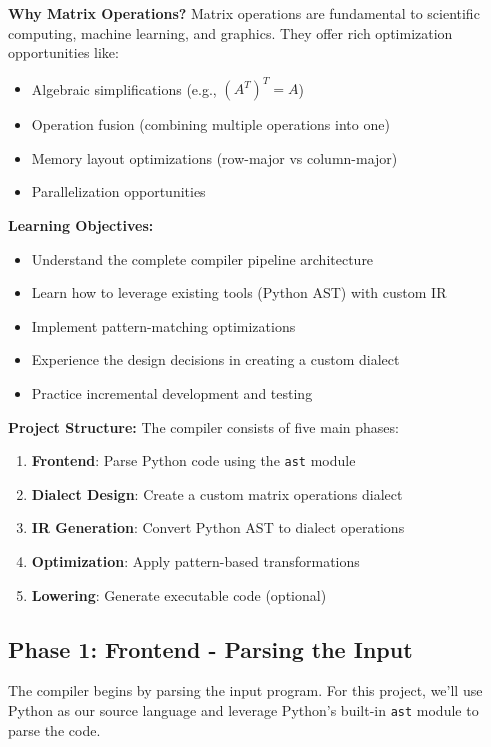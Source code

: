 \documentclass[11pt,a4paper]{article}
\begin{document}
\textbf{Why Matrix Operations?}
Matrix operations are fundamental to scientific computing, machine learning, and graphics. They offer rich optimization opportunities like:
\begin{itemize}
    \item Algebraic simplifications (e.g., $(A^T)^T = A$)
    \item Operation fusion (combining multiple operations into one)
    \item Memory layout optimizations (row-major vs column-major)
    \item Parallelization opportunities
\end{itemize}

\textbf{Learning Objectives:}
\begin{itemize}
    \item Understand the complete compiler pipeline architecture
    \item Learn how to leverage existing tools (Python AST) with custom IR
    \item Implement pattern-matching optimizations
    \item Experience the design decisions in creating a custom dialect
    \item Practice incremental development and testing
\end{itemize}

\textbf{Project Structure:}
The compiler consists of five main phases:
\begin{enumerate}
    \item \textbf{Frontend}: Parse Python code using the \texttt{ast} module
    \item \textbf{Dialect Design}: Create a custom matrix operations dialect
    \item \textbf{IR Generation}: Convert Python AST to dialect operations
    \item \textbf{Optimization}: Apply pattern-based transformations
    \item \textbf{Lowering}: Generate executable code (optional)
\end{enumerate}

\subsection{Phase 1: Frontend - Parsing the Input}

The compiler begins by parsing the input program. For this project, we'll use Python as our source language and leverage Python's built-in \texttt{ast} module to parse the code.
\end{document}
